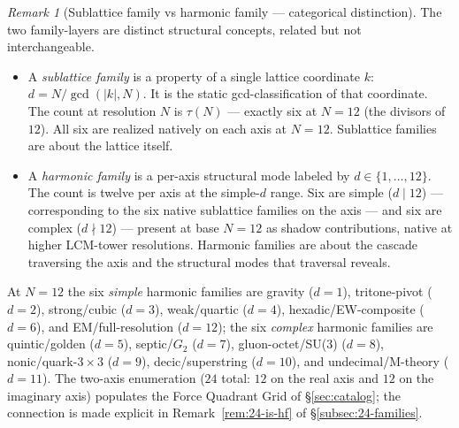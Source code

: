 \documentclass[11pt,a4paper]{article}
\theoremstyle{definition}
\theoremstyle{remark}
\newtheorem{remark}[theorem]{Remark}
\begin{document}
\begin{remark}[Sublattice family vs harmonic family --- categorical distinction]\label{rem:hf-vs-sf}
The two family-layers are distinct structural concepts, related but not interchangeable.
\begin{itemize}[leftmargin=*]
\item A \emph{sublattice family} is a property of a single lattice coordinate $k$: $d = N/\gcd(|k|,N)$. It is the static gcd-classification of that coordinate. The count at resolution $N$ is $\tau(N)$ --- exactly six at $N=12$ (the divisors of $12$). All six are realized natively on each axis at $N=12$. Sublattice families are about the lattice itself.
\item A \emph{harmonic family} is a per-axis structural mode labeled by $d \in \{1,\ldots,12\}$. The count is twelve per axis at the simple-$d$ range. Six are simple ($d \mid 12$) --- corresponding to the six native sublattice families on the axis --- and six are complex ($d \nmid 12$) --- present at base $N=12$ as shadow contributions, native at higher LCM-tower resolutions. Harmonic families are about the cascade traversing the axis and the structural modes that traversal reveals.
\end{itemize}
At $N=12$ the six \emph{simple} harmonic families are gravity ($d=1$), tritone-pivot ($d=2$), strong/cubic ($d=3$), weak/quartic ($d=4$), hexadic/EW-composite ($d=6$), and EM/full-resolution ($d=12$); the six \emph{complex} harmonic families are quintic/golden ($d=5$), septic/$G_{2}$ ($d=7$), gluon-octet/SU($3$) ($d=8$), nonic/quark-$3{\times}3$ ($d=9$), decic/superstring ($d=10$), and undecimal/M-theory ($d=11$). The two-axis enumeration ($24$ total: $12$ on the real axis and $12$ on the imaginary axis) populates the Force Quadrant Grid of \S\ref{sec:catalog}; the connection is made explicit in Remark~\ref{rem:24-is-hf} of \S\ref{subsec:24-families}.
\end{remark}
\end{document}
